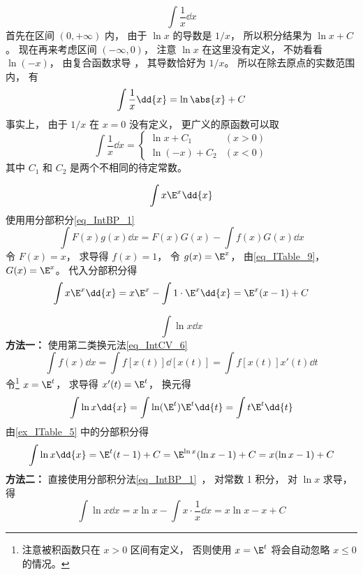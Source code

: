 \begin{example}{}\label{ex_ITable_11}
\begin{equation}
\int \frac1x \dd{x}
\end{equation}
首先在区间 $(0,+\infty)$ 内， 由于 $\ln x$ 的导数是 $1/x$， 所以积分结果为 $\ln x + C$。 现在再来考虑区间 $(-\infty, 0)$， 注意 $\ln x$ 在这里没有定义， 不妨看看 $\ln(-x)$， 由复合函数求导%
， 其导数恰好为 $1/x$。 所以在除去原点的实数范围内， 有
\begin{equation}
\int \frac1x \dd{x} = \ln\abs{x} + C
\end{equation}
事实上， 由于 $1/x$ 在 $x=0$ 没有定义， 更广义的原函数可以取
\begin{equation}
\int \frac1x \dd{x} =
\begin{cases}
\ln x + C_1 & (x > 0)\\
\ln (-x) + C_2 & (x < 0)
\end{cases}
\end{equation}
其中 $C_1$ 和 $C_2$ 是两个不相同的待定常数。
\end{example}

\begin{example}{}\label{ex_ITable_5}
\begin{equation}
\int x\E^x \dd{x}
\end{equation}
使用用分部积分\autoref{eq_IntBP_1}~
\begin{equation}
\int F(x)g(x) \dd{x}  = F(x)G(x) - \int f(x)G(x) \dd{x}
\end{equation}
令 $F(x) = x$， 求导得 $f(x) = 1$， 令 $g(x) = \E^x$， 由\autoref{eq_ITable_9}， $G(x) = \E^x$。 代入分部积分得
\begin{equation}
\int x\E^x \dd{x} = x\E^x - \int 1\cdot \E^x \dd{x} = \E^x(x - 1) + C
\end{equation}
\end{example}

\begin{example}{}\label{ex_ITable_6}
\begin{equation}
\int \ln x \dd{x}
\end{equation}
\textbf{方法一：} 使用第二类换元法\autoref{eq_IntCV_6}~
\begin{equation}
\int f(x) \dd{x} = \int f[x(t)] \dd{[x(t)]} = \int f[x(t)]x'(t) \dd{t}
\end{equation}
令\footnote{注意被积函数只在 $x>0$ 区间有定义， 否则使用 $x = \E^t$ 将会自动忽略 $x\leqslant 0$ 的情况。} $x = \E^t$， 求导得 $x'(t) = \E^t$， 换元得
\begin{equation}
\int \ln x \dd{x} = \int \ln(\E^t) \E^t  \dd{t} = \int t \E^t  \dd{t}
\end{equation}
由\autoref{ex_ITable_5} 中的分部积分得
\begin{equation}
\int \ln x \dd{x} = \E^t (t-1) + C = \E^{\ln x} (\ln x -1) + C = x (\ln x-1) + C
\end{equation}
\textbf{方法二：} 直接使用分部积分法\autoref{eq_IntBP_1}~， 对常数 1 积分， 对 $\ln x$ 求导， 得
\begin{equation}
\int \ln x \dd{x} = x\ln x - \int x\cdot \frac1x \dd{x} = x\ln x - x + C
\end{equation}
\end{example}


